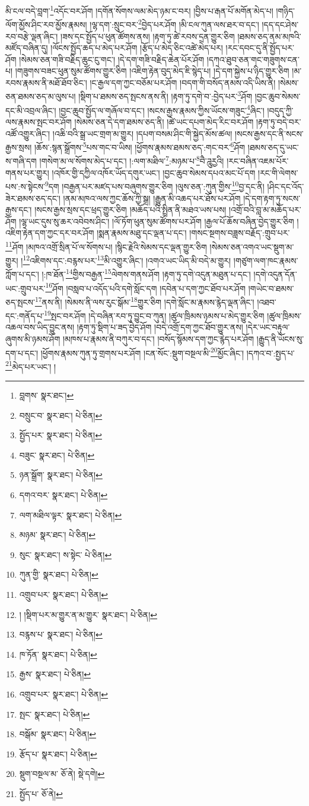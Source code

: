 མི་ངལ་བདེ་བླག་\footnote{བླགས་  སྣར་ཐང་། }འདོང་བར་ཤོག །དགོན་སོགས་ལམ་མེད་ཉམ་ང་བར། །བྱིས་པ་རྒན་པོ་མགོན་མེད་པ། །གཉིད་ལོག་མྱོས་ཤིང་རབ་མྱོས་རྣམས། །ལྷ་དག་:སྲུང་བར་\footnote{བསྲུང་བ་  སྣར་ཐང་།  པེ་ཅིན། }བྱེད་པར་ཤོག །མི་ངལ་ཀུན་ལས་ཐར་བ་དང་། །དད་དང་ཤེས་རབ་བརྩེ་ལྡན་ཞིང་། །ཟས་དང་སྤྱོད་པ་ཕུན་ཚོགས་ནས། །རྟག་ཏུ་ཚེ་རབས་དྲན་གྱུར་ཅིག །ཐམས་ཅད་ནམ་མཁའི་མཛོད་བཞིན་དུ། །ལོངས་སྤྱོད་ཆད་པ་མེད་པར་ཤོག །རྩོད་པ་མེད་ཅིང་འཚེ་མེད་པར། །རང་དབང་དུ་ནི་སྤྱོད་པར་ཤོག །སེམས་ཅན་གཟི་བརྗིད་ཆུང་ངུ་གང་། །དེ་དག་གཟི་བརྗིད་ཆེན་པོར་ཤོག །དཀའ་ཐུབ་ཅན་གང་གཟུགས་ངན་པ། །གཟུགས་བཟང་ཕུན་སུམ་ཚོགས་གྱུར་ཅིག །འཇིག་རྟེན་བུད་མེད་ཇི་སྙེད་པ། །དེ་དག་སྐྱེས་པ་ཉིད་གྱུར་ཅིག །མ་རབས་རྣམས་ནི་མཐོ་ཐོབ་ཅིང་། །ང་རྒྱལ་དག་ཀྱང་བཅོམ་པར་ཤོག །བདག་གི་བསོད་ནམས་འདི་ཡིས་ནི། །སེམས་ཅན་ཐམས་ཅད་མ་ལུས་པ། །སྡིག་པ་ཐམས་ཅད་སྤངས་ནས་ནི། །རྟག་ཏུ་དགེ་བ་:བྱེད་པར་\footnote{སྤྱོད་པར་  སྣར་ཐང་།  པེ་ཅིན། }ཤོག །བྱང་ཆུབ་སེམས་དང་མི་འབྲལ་ཞིང་། །བྱང་ཆུབ་སྤྱོད་ལ་གཞོལ་བ་དང་། །སངས་རྒྱས་རྣམས་ཀྱིས་ཡོངས་གཟུང་\footnote{བཟུང་  སྣར་ཐང་།  པེ་ཅིན། }ཞིང་། །བདུད་ཀྱི་ལས་རྣམས་སྤང་བར་ཤོག །སེམས་ཅན་དེ་དག་ཐམས་ཅད་ནི། །ཚེ་ཡང་དཔག་མེད་རིང་བར་ཤོག །རྟག་ཏུ་བདེ་བར་འཚོ་འགྱུར་ཞིང་། །འཆི་བའི་སྒྲ་ཡང་གྲག་མ་གྱུར། །དཔག་བསམ་ཤིང་གི་སྐྱེད་མོས་ཚལ། །སངས་རྒྱས་དང་ནི་སངས་རྒྱས་སྲས། །ཆོས་:སྙན་སྒྲོགས་\footnote{ཉན་སྒྲོག་  སྣར་ཐང་།  པེ་ཅིན། }པས་གང་བ་ཡིས། །ཕྱོགས་རྣམས་ཐམས་ཅད་:གང་བར་\footnote{དགའ་བར་  སྣར་ཐང་།  པེ་ཅིན། }ཤོག །ཐམས་ཅད་དུ་ཡང་ས་གཞི་དག །གསེག་མ་ལ་སོགས་མེད་པ་དང་། །:ལག་མཐིལ་\footnote{ལག་མཐིལ་ལྟར་  སྣར་ཐང་།  པེ་ཅིན། }:མཉམ་པ་\footnote{མཉམ་  སྣར་ཐང་།  པེ་ཅིན། }བཻ་ཌཱུརྱའི། །རང་བཞིན་འཇམ་པོར་གནས་པར་གྱུར། །འཁོར་གྱི་དཀྱིལ་འཁོར་ཡོད་དགུར་ཡང་། །བྱང་ཆུབ་སེམས་དཔའ་མང་པོ་དག །རང་གི་ལེགས་པས་:ས་སྟེངས་\footnote{སུང་  སྣར་ཐང་། ས་སྟེང་  པེ་ཅིན། }དག །བརྒྱན་པར་མཛད་པས་བཞུགས་གྱུར་ཅིག །ལུས་ཅན་:ཀུན་གྱིས་\footnote{ཀུན་གྱི་  སྣར་ཐང་།  པེ་ཅིན། }བྱ་དང་ནི། །ཤིང་དང་འོད་ཟེར་ཐམས་ཅད་དང་། །ནམ་མཁའ་ལས་ཀྱང་ཆོས་ཀྱི་སྒྲ། །རྒྱུན་མི་འཆད་པར་ཐོས་པར་ཤོག །དེ་དག་རྟག་ཏུ་སངས་རྒྱས་དང་། །སངས་རྒྱས་སྲས་དང་ཕྲད་གྱུར་ཅིག །མཆོད་པའི་སྤྲིན་ནི་མཐའ་ཡས་པས། །འགྲོ་བའི་བླ་མ་མཆོད་པར་ཤོག །ལྷ་ཡང་དུས་སུ་ཆར་འབེབས་ཤིང་། །ལོ་ཏོག་ཕུན་སུམ་ཚོགས་པར་ཤོག །རྒྱལ་པོ་ཆོས་བཞིན་བྱེད་གྱུར་ཅིག །འཇིག་རྟེན་དག་ཀྱང་དར་བར་ཤོག །སྨན་རྣམས་མཐུ་དང་ལྡན་པ་དང་། །གསང་སྔགས་བཟླས་བརྗོད་:གྲུབ་པར་\footnote{འགྲུབ་པར་  སྣར་ཐང་།  པེ་ཅིན། }ཤོག །མཁའ་འགྲོ་སྲིན་པོ་ལ་སོགས་པ། །སྙིང་རྗེའི་སེམས་དང་ལྡན་གྱུར་ཅིག །སེམས་ཅན་འགའ་ཡང་སྡུག་མ་གྱུར། །\footnote{། །སྡིག་པར་མ་གྱུར་ན་མ་གྱུར་  སྣར་ཐང་།  པེ་ཅིན། }འཇིགས་དང་:བརྙས་པར་\footnote{བརྙས་པ་  སྣར་ཐང་།  པེ་ཅིན། }མི་འགྱུར་ཞིང་། །འགའ་ཡང་ཡིད་མི་བདེ་མ་གྱུར། །གཙུག་ལག་ཁང་རྣམས་ཀློག་པ་དང་། །:ཁ་ཐོན་\footnote{ཁ་ཏོན་  སྣར་ཐང་།  པེ་ཅིན། }གྱིས་བརྒྱན་\footnote{རྒྱས་  སྣར་ཐང་།  པེ་ཅིན། }ལེགས་གནས་ཤོག །རྟག་ཏུ་དགེ་འདུན་མཐུན་པ་དང་། །དགེ་འདུན་དོན་ཡང་:གྲུབ་པར་\footnote{འགྲུབ་པར་  སྣར་ཐང་།  པེ་ཅིན། }ཤོག །བསླབ་པ་འདོད་པའི་དགེ་སློང་དག །དབེན་པ་དག་ཀྱང་ཐོབ་པར་ཤོག །གཡེང་བ་ཐམས་ཅད་སྤངས་\footnote{སྤང་  སྣར་ཐང་།  པེ་ཅིན། }ནས་ནི། །སེམས་ནི་ལས་རུང་སྒོམ་\footnote{བསྒོམ་  སྣར་ཐང་།  པེ་ཅིན། }གྱུར་ཅིག །དགེ་སློང་མ་རྣམས་རྙེད་ལྡན་ཞིང་། །འཐབ་དང་:གནོད་པ་\footnote{རྩོད་པ་  སྣར་ཐང་།  པེ་ཅིན། }སྤང་བར་ཤོག །དེ་བཞིན་རབ་ཏུ་བྱུང་བ་ཀུན། །ཚུལ་ཁྲིམས་ཉམས་པ་མེད་གྱུར་ཅིག །ཚུལ་ཁྲིམས་འཆལ་བས་ཡིད་བྱུང་ནས། །རྟག་ཏུ་སྡིག་པ་ཟད་བྱེད་ཤོག །བདེ་འགྲོ་དག་ཀྱང་ཐོབ་གྱུར་ནས། །དེར་ཡང་བརྟུལ་ཞུགས་མི་ཉམས་ཤོག །མཁས་པ་རྣམས་ནི་བཀུར་བ་དང་། །བསོད་སྙོམས་དག་ཀྱང་རྙེད་པར་ཤོག །རྒྱུད་ནི་ཡོངས་སུ་དག་པ་དང་། །ཕྱོགས་རྣམས་ཀུན་ཏུ་གྲགས་པར་ཤོག །ངན་སོང་:སྡུག་བསྔལ་མི་\footnote{སྡུག་བསྔལ་མ་  ཅོ་ནེ།  སྡེ་དགེ། }མྱོང་ཞིང་། །དཀའ་བ་:སྤྱད་པ་\footnote{སྤྱོད་པ་  ཅོ་ནེ། }མེད་པར་ཡང་། །
